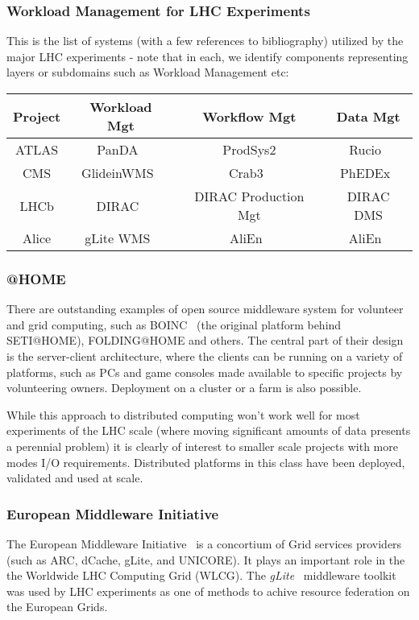 \subsubsection{Workload Management for LHC Experiments}
This is the list of systems (with a few references to bibliography) utilized by the major LHC experiments - note that in each, we identify components representing layers or subdomains such as Workload Management etc:

\begin{center}
  \begin{tabular}{ c | c | c | c }
    \hline
    \textbf{Project} & \textbf{Workload Mgt} & \textbf{Workflow Mgt} & \textbf{Data Mgt}\\ \hline \hline
    ATLAS & PanDA~\cite{panda_chep10} & ProdSys2 & Rucio~\cite{rucio_chep13}\\ \hline
    CMS  & GlideinWMS~\cite{glideinwms} & Crab3~\cite{crab3_chep12} & PhEDEx~\cite{phedex_chep09,phedex_chep10}\\ \hline
    LHCb  & DIRAC~\cite{dirac_acat09}  & DIRAC Production Mgt & DIRAC DMS\\ \hline
    Alice  & gLite WMS~\cite{glite_chep09} & AliEn~\cite{alien_chep07} & AliEn~\cite{alien_chep07}\\ 
    \hline
  \end{tabular}
\end{center}

\subsubsection{@HOME}
\label{at_home}
There are outstanding examples of open source middleware system for volunteer and grid computing, such as BOINC~\cite{boinc} (the original platform behind SETI@HOME),
FOLDING@HOME and others. The central part of their design is the server-client architecture, where the clients can be running on a variety of platforms,
such as PCs and game consoles made available to specific projects by volunteering owners. Deployment on a cluster or a farm is also possible.

While this approach to distributed computing won't work well for most experiments of the LHC scale (where moving significant amounts of data presents a perennial problem)
it is clearly of interest to smaller scale projects with more modes I/O requirements. Distributed platforms in this class have been deployed, validated and used at scale.

\subsubsection{European Middleware Initiative}
The European Middleware Initiative~\cite{emi} is a concortium of Grid services providers (such as ARC, dCache, gLite, and UNICORE).
It plays an important role in the the Worldwide LHC Computing Grid (WLCG). The \textit{gLite}~\cite{glite_chep09} middleware toolkit was used by LHC experiments as one of methods
to achive resource federation on the European Grids. 

